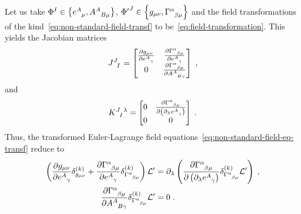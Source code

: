 \documentclass[../../main.tex]{subfiles}
\begin{document}
Let us take $\Phi^I \in \left\{\tensor{e}{^A_\mu}, \tensor{A}{^A_{B\mu}}\right\}$, ${\Phi'}^J \in \left\{g_{\mu\nu}, \tensor{\Gamma}{^\alpha_{\beta\mu}} \right\}$ and the field transformations of the kind~\eqref{eq:non-standard-field-transf} to be~\eqref{eq:field-transformation}. This yields the Jacobian matrices
\begin{equation}
  \label{eq:j-jacobian-for-gravity}
  \tensor{J}{^{J}_I} = \begin{bmatrix}
    \frac{\partial g_{\mu\nu}}{\partial \tensor{e}{^A_\gamma}} & \frac{\partial \tensor{\Gamma}{^\alpha_{\beta\mu}}}{\partial \tensor{e}{^A_\gamma}}    \\
    0                                                          & \frac{\partial \tensor{\Gamma}{^\alpha_{\beta\mu}}}{\partial \tensor{A}{^A_{B\gamma}}}
  \end{bmatrix} \;,
\end{equation}
and
\begin{equation}
  \label{eq:k-jacobian-for-gravity}
  \tensor{K}{^J_I^\lambda} = \begin{bmatrix}
    0 & \frac{\partial \tensor{\Gamma}{^\alpha_{\beta\mu}}}{\partial \left(\partial_\lambda\tensor{e}{^A_\gamma}\right)} \\
    0 & 0
  \end{bmatrix} \;.
\end{equation}
Thus, the transformed Euler-Lagrange field equations~\eqref{eq:non-standard-field-eq-transf} reduce to
\begin{subequations}\label{eq:non-standard-field-eq-transf-for-gravity}
  \begin{align}
    \left(\frac{\partial g_{\mu\nu}}{\partial \tensor{e}{^A_\gamma}} \delta^{(k)}_{g_{\mu\nu}} + \frac{\partial \tensor{\Gamma}{^\alpha_{\beta\mu}}}{\partial \tensor{e}{^A_\gamma}} \delta^{(k)}_{\tensor{\Gamma}{^\alpha_{\beta\mu}}}\right) \mathcal{L}' & = \partial_\lambda \left(\frac{\partial \tensor{\Gamma}{^\alpha_{\beta\mu}}}{\partial \left(\partial_\lambda \tensor{e}{^A_\gamma}\right)} \delta^{(k)}_{\tensor{\Gamma}{^\alpha_{\beta\mu}}}\mathcal{L}' \right) \;, \label{eq:transformed-einstein-like-field-eq} \\
    \frac{\partial \tensor{\Gamma}{^\alpha_{\beta\mu}}}{\partial \tensor{A}{^A_{B\gamma}}} \delta^{(k)}_{\tensor{\Gamma}{^\alpha_{\beta\mu}}} \mathcal{L}'                                                                                                  & = 0 \;. \label{eq:transformed-cartan-like-field}
  \end{align}
\end{subequations}
\end{document}
